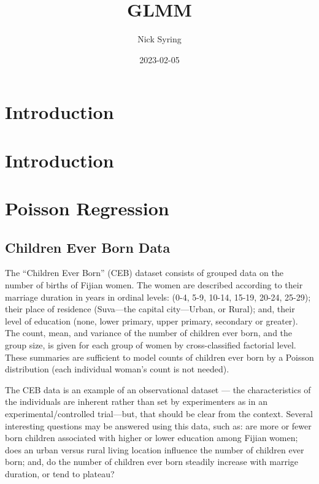 \documentclass[
]{book}
\title{GLMM}
\author{Nick Syring}
\date{2023-02-05}
\begin{document}
\maketitle

{
\setcounter{tocdepth}{1}
\tableofcontents
}
\hypertarget{introduction}{%
\chapter{Introduction}\label{introduction}}

\hypertarget{intro}{%
\chapter{Introduction}\label{intro}}

\hypertarget{poisson-regression}{%
\chapter{Poisson Regression}\label{poisson-regression}}

\hypertarget{children-ever-born-data}{%
\section{Children Ever Born Data}\label{children-ever-born-data}}

The ``Children Ever Born'' (CEB) dataset consists of grouped data on the number of births of Fijian women. The women are described according to their marriage duration in years in ordinal levels: (0-4, 5-9, 10-14, 15-19, 20-24, 25-29); their place of residence (Suva---the capital city---Urban, or Rural); and, their level of education (none, lower primary, upper primary, secondary or greater). The count, mean, and variance of the number of children ever born, and the group size, is given for each group of women by cross-classified factorial level. These summaries are sufficient to model counts of children ever born by a Poisson distribution (each individual woman's count is not needed).

The CEB data is an example of an observational dataset --- the characteristics of the individuals are inherent rather than set by experimenters as in an experimental/controlled trial---but, that should be clear from the context. Several interesting questions may be answered using this data, such as: are more or fewer born children associated with higher or lower education among Fijian women; does an urban versus rural living location influence the number of children ever born; and, do the number of children ever born steadily increase with marrige duration, or tend to plateau?
\end{document}
